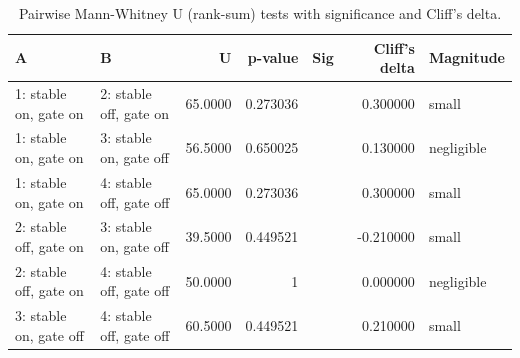 \begin{table}[htbp]
\centering
\caption{Pairwise Mann-Whitney U (rank-sum) tests with significance and Cliff's delta.}
\label{tab:wilcoxon_pairwise}
\begin{tabular}{llrrrrl}
\toprule
A & B & U & p-value & Sig & Cliff's delta & Magnitude \\
\midrule
1: stable on, gate on & 2: stable off, gate on & 65.0000 & 0.273036 &  & 0.300000 & small \\
1: stable on, gate on & 3: stable on, gate off & 56.5000 & 0.650025 &  & 0.130000 & negligible \\
1: stable on, gate on & 4: stable off, gate off & 65.0000 & 0.273036 &  & 0.300000 & small \\
2: stable off, gate on & 3: stable on, gate off & 39.5000 & 0.449521 &  & -0.210000 & small \\
2: stable off, gate on & 4: stable off, gate off & 50.0000 & 1 &  & 0.000000 & negligible \\
3: stable on, gate off & 4: stable off, gate off & 60.5000 & 0.449521 &  & 0.210000 & small \\
\bottomrule
\end{tabular}
\end{table}
